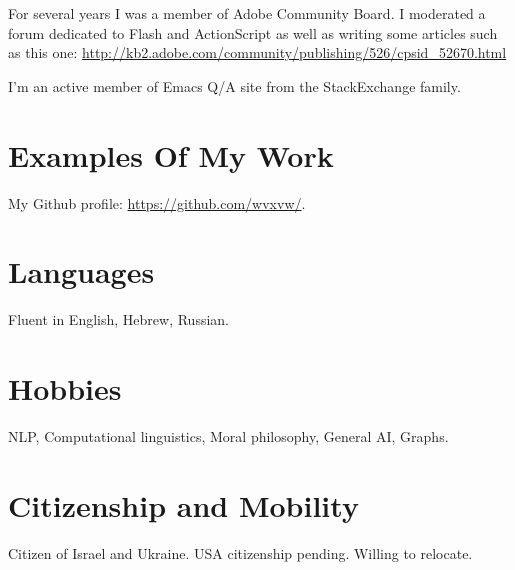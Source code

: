 \documentclass[11pt]{article}
\begin{document}
For several years I was a member of Adobe Community Board. I moderated a forum
dedicated to Flash and ActionScript as well as writing some articles such as
this one: \url{http://kb2.adobe.com/community/publishing/526/cpsid_52670.html}

I'm an active member of Emacs Q/A site from the StackExchange family.

\section*{Examples Of My Work}
\label{sec-5}
My Github profile:
\url{https://github.com/wvxvw/}.

\section*{Languages}
\label{sec-6}
Fluent in English, Hebrew, Russian.

\section*{Hobbies}
\label{sec-7}
NLP, Computational linguistics, Moral philosophy, General AI, Graphs.

\section*{Citizenship and Mobility}
\label{sec-8}
Citizen of Israel and Ukraine.  USA citizenship pending.  Willing
to relocate.
\end{document}
